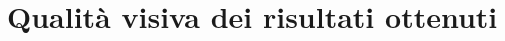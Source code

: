 \section{Qualità visiva dei risultati ottenuti}
\label{sec:chapter_prove_sperimentali_qualita_visiva}